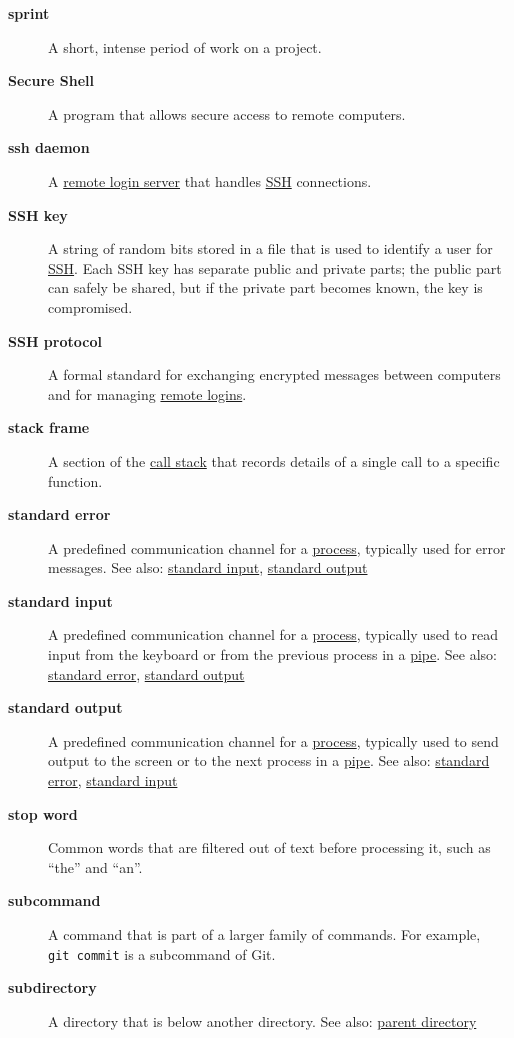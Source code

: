 \documentclass[
]{krantz}
\begin{document}
\begin{description}
\item[\textbf{sprint}]
A short, intense period of work on a project.
\item[\textbf{Secure Shell}]
A program that allows secure access to remote computers.
\item[\textbf{ssh daemon}]
A \protect\hyperlink{remote_login_server}{remote login server} that handles \protect\hyperlink{ssh}{SSH} connections.
\item[\textbf{SSH key}]
A string of random bits stored in a file that is used to identify a user for \protect\hyperlink{ssh}{SSH}. Each SSH key has separate public and private parts; the public part can safely be shared, but if the private part becomes known, the key is compromised.
\item[\textbf{SSH protocol}]
A formal standard for exchanging encrypted messages between computers and for managing \protect\hyperlink{remote_login_server}{remote logins}.
\item[\textbf{stack frame}]
A section of the \protect\hyperlink{call_stack}{call stack} that records details of a single call to a specific function.
\item[\textbf{standard error}]
A predefined communication channel for a \protect\hyperlink{process}{process}, typically used for error messages. See also: \protect\hyperlink{stdin}{standard input}, \protect\hyperlink{stdout}{standard output}
\item[\textbf{standard input}]
A predefined communication channel for a \protect\hyperlink{process}{process}, typically used to read input from the keyboard or from the previous process in a \protect\hyperlink{pipe_shell}{pipe}. See also: \protect\hyperlink{stderr}{standard error}, \protect\hyperlink{stdout}{standard output}
\item[\textbf{standard output}]
A predefined communication channel for a \protect\hyperlink{process}{process}, typically used to send output to the screen or to the next process in a \protect\hyperlink{pipe_shell}{pipe}. See also: \protect\hyperlink{stderr}{standard error}, \protect\hyperlink{stdin}{standard input}
\item[\textbf{stop word}]
Common words that are filtered out of text before processing it, such as ``the'' and ``an''.
\item[\textbf{subcommand}]
A command that is part of a larger family of commands. For example, \texttt{git\ commit} is a subcommand of Git.
\item[\textbf{subdirectory}]
A directory that is below another directory. See also: \protect\hyperlink{parent_directory}{parent directory}

\end{description}
\end{document}
